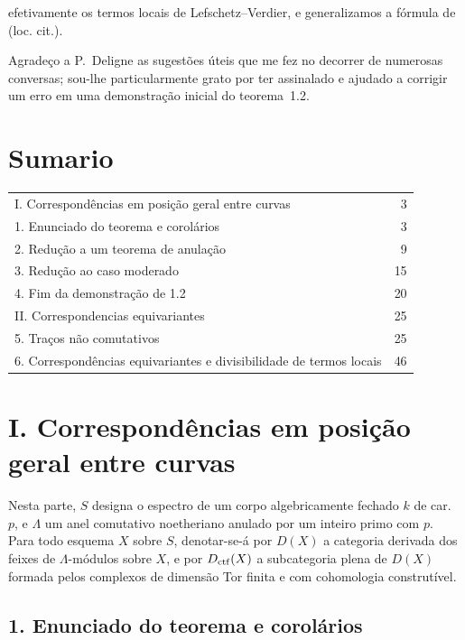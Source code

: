 efetivamente os termos locais de Lefschetz--Verdier, e generalizamos a fórmula de (loc. cit.).

Agradeço a P.~Deligne as sugestões úteis que me fez no decorrer de numerosas conversas; sou-lhe particularmente grato por ter assinalado e ajudado a corrigir um erro em uma demonstração inicial do teorema~1.2.

\section*{Sumario}
\begin{tabular}{@{}p{}r@{}}
I. Correspondências em posição geral entre curvas & 3\\
1. Enunciado do teorema e corolários & 3\\
2. Redução a um teorema de anulação & 9\\
3. Redução ao caso moderado & 15\\
4. Fim da demonstração de 1.2 & 20\\
II. Correspondencias equivariantes & 25\\
5. Traços não comutativos & 25\\
6. Correspondências equivariantes e divisibilidade de termos locais & 46
\end{tabular}

\section*{I. Correspondências em posição geral entre curvas}

Nesta parte, $S$ designa o espectro de um corpo algebricamente fechado $k$ de car.~$p$, e $\Lambda$ um anel comutativo noetheriano anulado por um inteiro primo com $p$. Para todo esquema $X$ sobre $S$, denotar-se-á por $D(X)$ a categoria derivada dos feixes de $\Lambda$-módulos sobre $X$, e por $D_{\mathrm{ctf}}(X)$ a subcategoria plena de $D(X)$ formada pelos complexos de dimensão Tor finita e com cohomologia construtível.

\subsection*{1. Enunciado do teorema e corolários}
